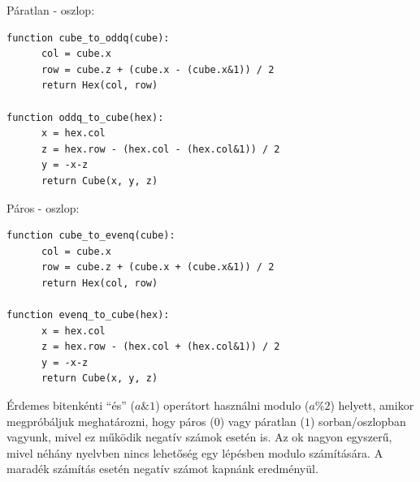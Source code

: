 Páratlan - oszlop:
\begin{verbatim}
function cube_to_oddq(cube):
      col = cube.x
      row = cube.z + (cube.x - (cube.x&1)) / 2
      return Hex(col, row)

function oddq_to_cube(hex):
      x = hex.col
      z = hex.row - (hex.col - (hex.col&1)) / 2
      y = -x-z
      return Cube(x, y, z)
\end{verbatim}

Páros - oszlop:
\begin{verbatim}
function cube_to_evenq(cube):
      col = cube.x
      row = cube.z + (cube.x + (cube.x&1)) / 2
      return Hex(col, row)

function evenq_to_cube(hex):
      x = hex.col
      z = hex.row - (hex.col + (hex.col&1)) / 2
      y = -x-z
      return Cube(x, y, z)
\end{verbatim}

\noindent Érdemes bitenkénti “és” ($a \& 1$) operátort használni modulo ($a \% 2$) helyett, amikor megpróbáljuk meghatározni, hogy páros ($0$) vagy páratlan ($1$) sorban/oszlopban vagyunk, mivel ez működik negatív számok esetén is. Az ok nagyon egyszerű, mivel néhány nyelvben nincs lehetőség egy lépésben modulo számítására. A maradék számítás esetén negatív számot kapnánk eredményül. 

